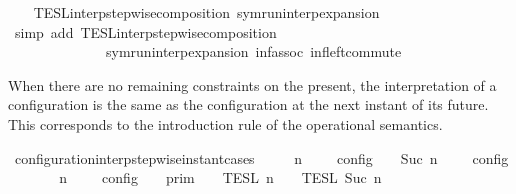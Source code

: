 \begin{isabellebody}
%
\isadelimproof
\ \ %
\endisadelimproof
%
\isatagproof
{}\isamarkupfalse%
\ TESL{\isacharunderscore}interp{\isacharunderscore}stepwise{\isacharunderscore}composition\ symrun{\isacharunderscore}interp{\isacharunderscore}expansion\isanewline
{}\isamarkupfalse%
\ {\isacharparenleft}simp\ add{\isacharcolon}\ TESL{\isacharunderscore}interp{\isacharunderscore}stepwise{\isacharunderscore}composition\isanewline
\ \ \ \ \ \ \ \ \ \ \ \ \ \ symrun{\isacharunderscore}interp{\isacharunderscore}expansion\ inf{\isacharunderscore}assoc\ inf{\isacharunderscore}left{\isacharunderscore}commute{\isacharparenright}%
\endisatagproof
{\isafoldproof}%
%
\isadelimproof
%
\endisadelimproof
%
\begin{isamarkuptext}%
When there are no remaining constraints on the present, the interpretation of
  a configuration is the same as the configuration at the next instant of its future.
  This corresponds to the introduction rule of the operational semantics.%
\end{isamarkuptext}\isamarkuptrue%
\isamarkupfalse%
\ configuration{\isacharunderscore}interp{\isacharunderscore}stepwise{\isacharunderscore}instant{\isacharunderscore}cases{\isacharcolon}\isanewline
\ \ \ {\isacartoucheopen}{\isasymlbrakk}\ {\isasymGamma}{\isacharcomma}\ n\ {\isasymturnstile}\ {\isacharbrackleft}{\isacharbrackright}\ {\isasymtriangleright}\ {\isasymPhi}\ {\isasymrbrakk}\isactrlsub c\isactrlsub o\isactrlsub n\isactrlsub f\isactrlsub i\isactrlsub g\ {\isacharequal}\ {\isasymlbrakk}\ {\isasymGamma}{\isacharcomma}\ Suc\ n\ {\isasymturnstile}\ {\isasymPhi}\ {\isasymtriangleright}\ {\isacharbrackleft}{\isacharbrackright}\ {\isasymrbrakk}\isactrlsub c\isactrlsub o\isactrlsub n\isactrlsub f\isactrlsub i\isactrlsub g{\isacartoucheclose}\isanewline
%
\isadelimproof
%
\endisadelimproof
%
\isatagproof
{}\isamarkupfalse%
\ {\isacharminus}\isanewline
\ \ \isamarkupfalse%
\ {\isacartoucheopen}{\isasymlbrakk}\ {\isasymGamma}{\isacharcomma}\ n\ {\isasymturnstile}\ {\isacharbrackleft}{\isacharbrackright}\ {\isasymtriangleright}\ {\isasymPhi}\ {\isasymrbrakk}\isactrlsub c\isactrlsub o\isactrlsub n\isactrlsub f\isactrlsub i\isactrlsub g\ {\isacharequal}\ {\isasymlbrakk}{\isasymlbrakk}\ {\isasymGamma}\ {\isasymrbrakk}{\isasymrbrakk}\isactrlsub p\isactrlsub r\isactrlsub i\isactrlsub m\ {\isasyminter}\ {\isasymlbrakk}{\isasymlbrakk}\ {\isacharbrackleft}{\isacharbrackright}\ {\isasymrbrakk}{\isasymrbrakk}\isactrlsub T\isactrlsub E\isactrlsub S\isactrlsub L\isactrlbsup {\isasymge}\ n\isactrlesup \ {\isasyminter}\ {\isasymlbrakk}{\isasymlbrakk}\ {\isasymPhi}\ {\isasymrbrakk}{\isasymrbrakk}\isactrlsub T\isactrlsub E\isactrlsub S\isactrlsub L\isactrlbsup {\isasymge}\ Suc\ n\isactrlesup {\isacartoucheclose}\isanewline

\end{isabellebody}
